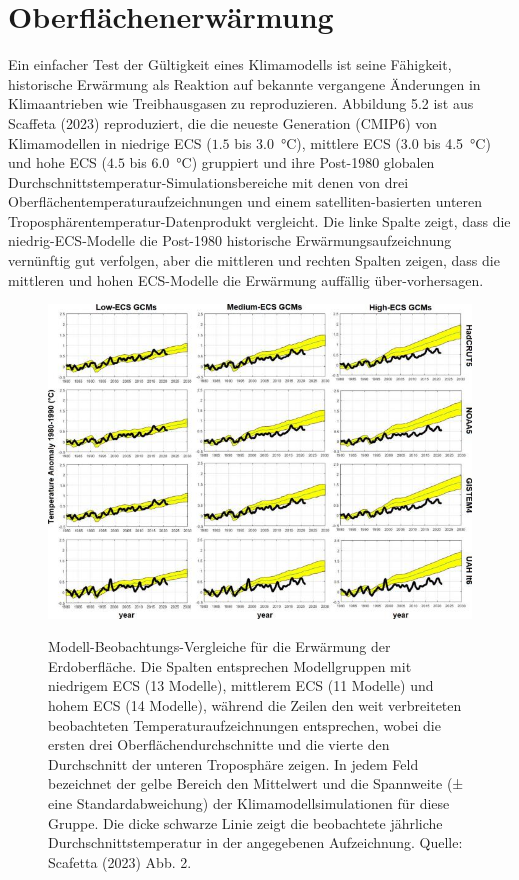 \documentclass[12pt,paper=a4,DIV=12,parskip=never,chapterprefix=false,headings=standardclasses]{scrreprt}
\begin{document}
\section{Oberflächenerwärmung}
Ein einfacher Test der Gültigkeit eines Klimamodells ist seine Fähigkeit, historische Erwärmung als Reaktion auf bekannte vergangene Änderungen in Klimaantrieben wie Treibhausgasen zu reproduzieren. Abbildung 5.2 ist aus Scaffeta (2023) reproduziert, die die neueste Generation (CMIP6) von Klimamodellen in niedrige ECS ($1.5$ bis \SI{3.0}{\celsius}), mittlere ECS ($3.0$ bis \SI{4.5}{\celsius}) und hohe ECS ($4.5$ bis \SI{6.0}{\celsius}) gruppiert und ihre Post-1980 globalen Durchschnittstemperatur-Simulationsbereiche mit denen von drei Oberflächentemperaturaufzeichnungen und einem satelliten-basierten unteren Troposphärentemperatur-Datenprodukt vergleicht.
Die linke Spalte zeigt, dass die niedrig-ECS-Modelle die Post-1980 historische Erwärmungsaufzeichnung vernünftig gut verfolgen, aber die mittleren und rechten Spalten zeigen, dass die mittleren und hohen ECS-Modelle die Erwärmung auffällig über-vorhersagen.

\begin{figure}[H]
\begin{center}
\includegraphics[width=1.0\textwidth]{bilder/bilderKlima-0026.jpg}\\[1cm]
\end{center}
\caption{Modell-Beobachtungs-Vergleiche für die Erwärmung der Erdoberfläche. Die Spalten entsprechen
Modellgruppen mit niedrigem ECS (13 Modelle), mittlerem ECS (11 Modelle) und hohem ECS (14 Modelle),
während die Zeilen den weit verbreiteten beobachteten Temperaturaufzeichnungen entsprechen, wobei die ersten drei
Oberflächendurchschnitte und die vierte den Durchschnitt der unteren Troposphäre zeigen. In jedem Feld bezeichnet der gelbe
Bereich den Mittelwert und die Spannweite (± eine Standardabweichung) der Klimamodellsimulationen für diese
Gruppe. Die dicke schwarze Linie zeigt die beobachtete jährliche Durchschnittstemperatur in der angegebenen Aufzeichnung.
Quelle: Scafetta (2023) Abb. 2.}
\end{figure}
\end{document}
